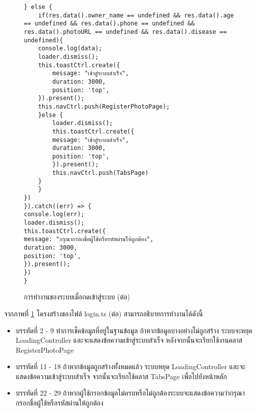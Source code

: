 \begin{figure}[H]
	{\lstset{language=Pascal}
	\begin{lstlisting}
} else {
	if(res.data().owner_name == undefined && res.data().age == undefined && res.data().phone == undefined && res.data().photoURL == undefined && res.data().disease == undefined){
	console.log(data);
	loader.dismiss();
	this.toastCtrl.create({
		message: "เข้าสู่ระบบสำเร็จ",
		duration: 3000,
		position: 'top',
	}).present();
	this.navCtrl.push(RegisterPhotoPage);
	}else {
		loader.dismiss();
		this.toastCtrl.create({
		message: "เข้าสู่ระบบสำเร็จ",
		duration: 3000,
		position: 'top',
		}).present();
		this.navCtrl.push(TabsPage)
	}
	}
})
}).catch((err) => {
console.log(err);
loader.dismiss();
this.toastCtrl.create({
message: "กรุณากรอกชื่อผู้ใช้หรือรหัสผ่านให้ถูกต้อง",
duration: 3000,
position: 'top',
}).present();
})
}
	\end{lstlisting}}
	\caption{การทำงานของระบบเมื่อกดเข้าสู่ระบบ (ต่อ)}
	\label{Fig:4-logincon1}
	\end{figure}
\newpage

จากภาพที่ \ref{Fig:4-logincon1} โครงสร้างของไฟล์ login.ts (ต่อ) สามารถอธิบายการทำงานได้ดังนี้
\begin{itemize}[label={--}]
\item บรรทัดที่ 2 - 9 ทำการเช็คข้อมูลที่อยู่ในฐานข้อมูล ถ้าหากข้อมูลบางอย่างไม่ถูกสร้าง ระบบจะหยุด LoadingController และจะแสดงข้อความเข้าสู่ระบบสำเร็จ หลังจากนั้นจะเรียกใช้งานคลาส RegisterPhotoPage
\item บรรทัดที่ 11 - 18 ถ้าหากข้อมูลถูกสร้างทั้งหมดแล้ว ระบบหยุด LoadingController และจะแสดงข้อความเข้าสู่ระบบสำเร็จ จากนั้นจะเรียกใช้คลาส TabsPage เพื่อไปยังหน้าหลัก
\item บรรทัดที่ 22 - 29 ถ้าหากผู้ใช้กรอกข้อมูลไม่ครบหรือไม่ถูกต้องระบบจะแสดงข้อความว่ากรุณากรอกชื่อผู้ใช้หรือรหัสผ่านให้ถูกต้อง
\end{itemize}
\newpage



